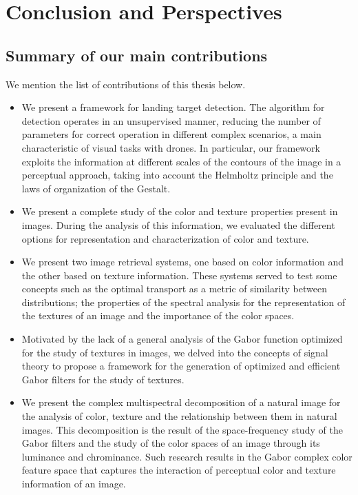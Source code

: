 \chapter{Conclusion and Perspectives}\label{ch:general_conclusion}

\section{Summary of our main contributions}

We mention the list of contributions of this thesis below.

\begin{itemize}
	\item We present a framework for landing target detection. The algorithm for detection operates in an unsupervised manner, reducing the number of parameters for correct operation in different complex scenarios, a main characteristic of visual tasks with drones. In particular, our framework exploits the information at different scales of the contours of the image in a perceptual approach, taking into account the Helmholtz principle and the laws of organization of the Gestalt.
	\item We present a complete study of the color and texture properties present in images. During the analysis of this information, we evaluated the different options for representation and characterization of color and texture.
	\item We present two image retrieval systems, one based on color information and the other based on texture information. These systems served to test some concepts such as the optimal transport as a metric of similarity between distributions; the properties of the spectral analysis for the representation of the textures of an image and the importance of the color spaces.
	\item Motivated by the lack of a general analysis of the Gabor function optimized for the study of textures in images, we delved into the concepts of signal theory to propose a framework for the generation of optimized and efficient Gabor filters for the study of textures.
	\item We present the complex multispectral decomposition of a natural image for the analysis of color, texture and the relationship between them in natural images. This decomposition is the result of the space-frequency study of the Gabor filters and the study of the color spaces of an image through its luminance and chrominance. Such research results in the Gabor complex color feature space that captures the interaction of perceptual color and texture information of an image.

\end{itemize}
